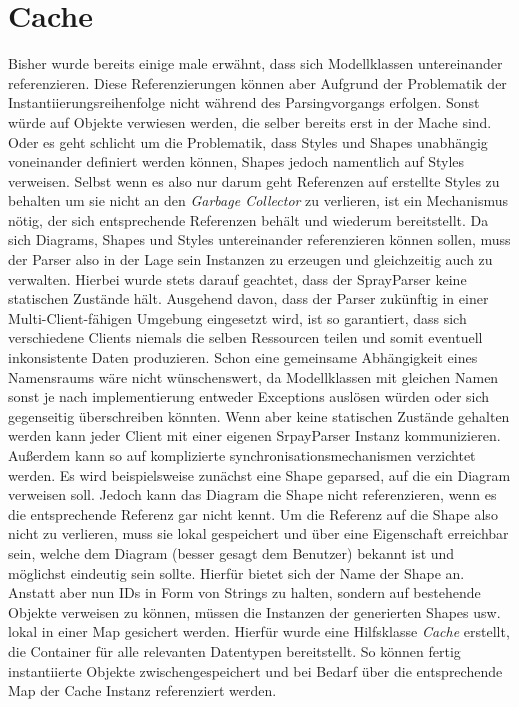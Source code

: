 \section{Cache}Bisher wurde bereits einige male erwähnt, dass sich Modellklassen untereinander referenzieren. Diese Referenzierungen können aber Aufgrund der Problematik der Instantiierungsreihenfolge nicht während des Parsingvorgangs erfolgen. Sonst würde auf Objekte verwiesen werden, die selber bereits erst in der Mache sind.
Oder es geht schlicht um die Problematik, dass Styles und Shapes unabhängig voneinander definiert werden können, Shapes jedoch namentlich auf Styles verweisen. Selbst wenn es also nur darum geht Referenzen auf erstellte Styles zu behalten um sie nicht an den \textit{Garbage Collector} zu verlieren, ist ein Mechanismus nötig, der sich entsprechende Referenzen behält und wiederum bereitstellt. Da sich Diagrams, Shapes und Styles untereinander referenzieren können sollen, muss der Parser also in der Lage sein Instanzen zu erzeugen und gleichzeitig auch zu verwalten. Hierbei wurde stets darauf geachtet, dass der SprayParser keine statischen Zustände hält. Ausgehend davon, dass der Parser zukünftig in einer Multi-Client-fähigen Umgebung eingesetzt wird, ist so garantiert, dass sich verschiedene Clients niemals die selben Ressourcen teilen und somit eventuell inkonsistente Daten produzieren. Schon eine gemeinsame Abhängigkeit eines Namensraums wäre nicht wünschenswert, da Modellklassen mit gleichen Namen sonst je nach implementierung entweder Exceptions auslösen würden oder sich gegenseitig überschreiben könnten. Wenn aber keine statischen Zustände gehalten werden kann jeder Client mit einer eigenen SrpayParser Instanz kommunizieren. Außerdem kann so auf komplizierte synchronisationsmechanismen verzichtet werden. Es wird beispielsweise zunächst eine Shape geparsed, auf die ein Diagram verweisen soll. Jedoch kann das Diagram die Shape nicht referenzieren, wenn es die entsprechende Referenz gar nicht kennt. Um die Referenz auf die Shape also nicht zu verlieren, muss sie lokal gespeichert und über eine Eigenschaft erreichbar sein, welche dem Diagram (besser gesagt dem Benutzer) bekannt ist und möglichst eindeutig sein sollte. Hierfür bietet sich der Name der Shape an. Anstatt aber nun IDs in Form von Strings zu halten, sondern auf bestehende Objekte verweisen zu können, müssen die Instanzen der generierten Shapes usw. lokal in einer Map gesichert werden. Hierfür wurde eine Hilfsklasse \textit{Cache} erstellt, die Container für alle relevanten Datentypen bereitstellt. So können fertig instantiierte Objekte zwischengespeichert und bei Bedarf über die entsprechende Map der Cache Instanz referenziert werden.
